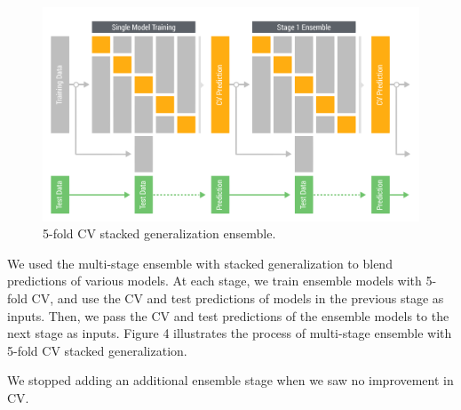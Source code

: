 \begin{figure}[!h]
  \centering
    \includegraphics[width=0.5 \textwidth]{cv_ensemble}
      \caption{5-fold CV stacked generalization ensemble.}
\end{figure}

We used the multi-stage ensemble with stacked generalization \cite{wolpert1992stacked} to blend predictions of various models.  At each stage, we train ensemble models with 5-fold CV, and use the CV and test predictions of models in the previous stage as inputs.  Then, we pass the CV and test predictions of the ensemble models to the next stage as inputs.  Figure 4 illustrates the process of multi-stage ensemble with 5-fold CV stacked generalization.

We stopped adding an additional ensemble stage when we saw no improvement in CV.